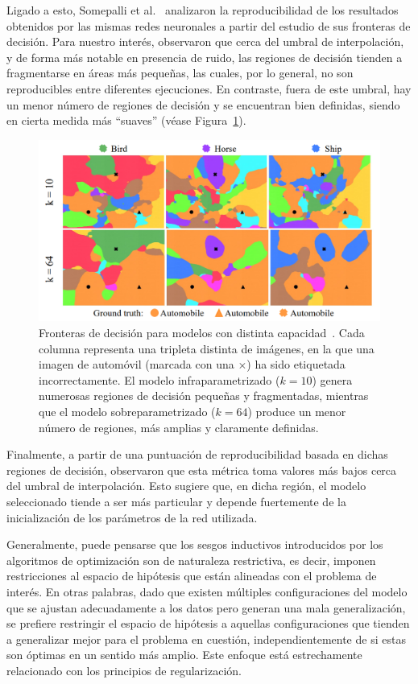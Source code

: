 Ligado a esto, Somepalli et al.~\cite{Somepalli2022} analizaron la reproducibilidad de los resultados obtenidos por las mismas redes neuronales a partir del estudio de sus fronteras de decisión. Para nuestro interés, observaron que cerca del umbral de interpolación, y de forma más notable en presencia de ruido, las regiones de decisión tienden a fragmentarse en áreas más pequeñas, las cuales, por lo general, no son reproducibles entre diferentes ejecuciones. En contraste, fuera de este umbral, hay un menor número de regiones de decisión y se encuentran bien definidas, siendo en cierta medida más ``suaves'' (véase Figura~\ref{fig:ground-truth-reproducibility}).

\begin{figure}[h]
    \centering
    \includegraphics[width=0.6\linewidth]{img/ground-truth-reproducibility.png}
    \caption[Fronteras de decisión para modelos con distinta capacidad~\cite{Somepalli2022}.]{Fronteras de decisión para modelos con distinta capacidad~\cite{Somepalli2022}. Cada columna representa una tripleta distinta de imágenes, en la que una imagen de automóvil (marcada con una $\times$) ha sido etiquetada incorrectamente. El modelo infraparametrizado ($k=10$) genera numerosas regiones de decisión pequeñas y fragmentadas, mientras que el modelo sobreparametrizado ($k=64$) produce un menor número de regiones, más amplias y claramente definidas.}\label{fig:ground-truth-reproducibility}
\end{figure}

Finalmente, a partir de una puntuación de reproducibilidad basada en dichas regiones de decisión, observaron que esta métrica toma valores más bajos cerca del umbral de interpolación. Esto sugiere que, en dicha región, el modelo seleccionado tiende a ser más particular y depende fuertemente de la inicialización de los parámetros de la red utilizada.

Generalmente, puede pensarse que los sesgos inductivos introducidos por los algoritmos de optimización son de naturaleza restrictiva, es decir, imponen restricciones al espacio de hipótesis que están alineadas con el problema de interés. En otras palabras, dado que existen múltiples configuraciones del modelo que se ajustan adecuadamente a los datos pero generan una mala generalización, se prefiere restringir el espacio de hipótesis a aquellas configuraciones que tienden a generalizar mejor para el problema en cuestión, independientemente de si estas son óptimas en un sentido más amplio. Este enfoque está estrechamente relacionado con los principios de regularización.

